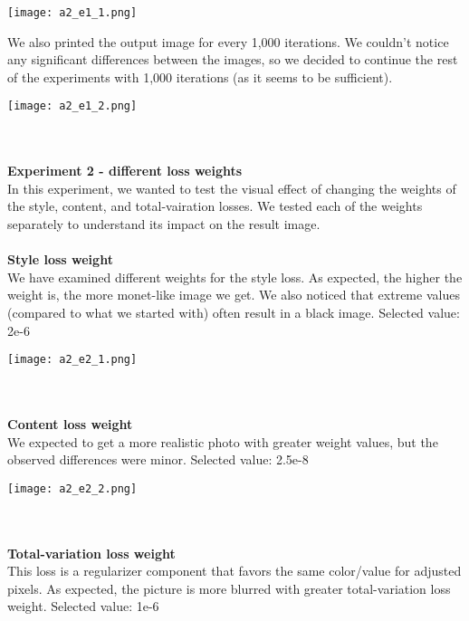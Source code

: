 \documentclass{article}
\begin{document}
\begin{center}
    \texttt{[image: a2\_e1\_1.png]}
\end{center}

We also printed the output image for every 1,000 iterations. We couldn’t notice any significant differences between the images, so we decided to continue the rest of the experiments with 1,000 iterations (as it seems to be sufficient).

\begin{center}
    \texttt{[image: a2\_e1\_2.png]}
\end{center}
\\\\
\newblock
\textbf{Experiment 2 - different loss weights}
\\
In this experiment, we wanted to test the visual effect of changing the weights of the style, content, and total-vairation losses.
We tested each of the weights separately to understand its impact on the result image.
\\\\
\newblock
\textbf{Style loss weight}
\\
We have examined different weights for the style loss. As expected, the higher the weight is, the more monet-like image we get. We also noticed that extreme values (compared to what we started with) often result in a black image.
Selected value: 2e-6

\begin{center}
    \texttt{[image: a2\_e2\_1.png]}
\end{center}
\\\\
\newblock
\textbf{Content loss weight}
\\
We expected to get a more realistic photo with greater weight values, but the observed differences were minor.
Selected value: 2.5e-8

\begin{center}
    \texttt{[image: a2\_e2\_2.png]}
\end{center}
\\\\
\newblock
\textbf{Total-variation loss weight}
\\
This loss is a regularizer component that favors the same color/value for adjusted pixels. As expected, the picture is more blurred with greater total-variation loss weight.
Selected value: 1e-6
\end{document}
